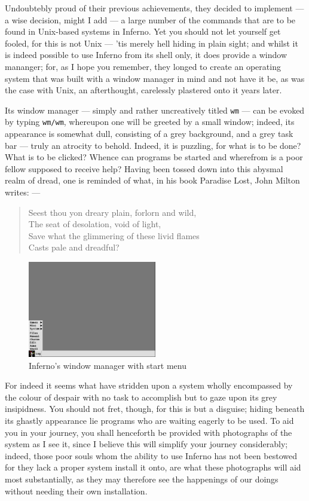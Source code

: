 \documentclass[a5paper,twoside,12pt]{report}
\begin{document}
  Undoubtebly proud of their previous achievements, they decided to implement — a wise decision, might I add — a large number of the commands that are to be found in Unix-based systems in Inferno. Yet you should not let yourself get fooled, for this is not Unix — 'tis merely hell hiding in plain sight; and whilst it is indeed possible to use Inferno from its shell only, it does provide a window mananger; for, as I hope you remember, they longed to create an operating system that was built with a window manager in mind and not have it be, as was the case with Unix, an afterthought, carelessly plastered onto it years later.

  Its window manager — simply and rather uncreatively titled \texttt{wm} — can be evoked by typing \texttt{wm/wm}, whereupon one will be greeted by a small window; indeed, its appearance is somewhat dull, consisting of a grey background, and a grey task bar — truly an atrocity to behold. Indeed, it is puzzling, for what is to be done? What is to be clicked? Whence can programs be started and wherefrom is a poor fellow supposed to receive help? Having been tossed down into this abysmal realm of dread, one is reminded of what, in his book Paradise Lost, John Milton writes: —

  \begin{quote}
    Seest thou yon dreary plain, forlorn and wild, \\
    The seat of desolation, void of light, \\
    Save what the glimmering of these livid flames \\
    Casts pale and dreadful?
  \end{quote}

  \begin{figure}
    \centering
    \includegraphics[width=0.5\textwidth]{imgs/start_menu.png}
    \caption{Inferno's window manager with start menu}
  \end{figure}

  For indeed it seems what have stridden upon a system wholly encompassed by the colour of despair with no task to accomplish but to gaze upon its grey insipidness. You should not fret, though, for this is but a disguise; hiding beneath its ghastly appearance lie programs who are waiting eagerly to be used. To aid you in your journey, you shall henceforth be provided with photographs of the system as I see it, since I believe this will simplify your journey considerably; indeed, those poor souls whom the ability to use Inferno has not been bestowed for they lack a proper system install it onto, are what these photographs will aid most substantially, as they may therefore see the happenings of our doings without needing their own installation.
\end{document}
